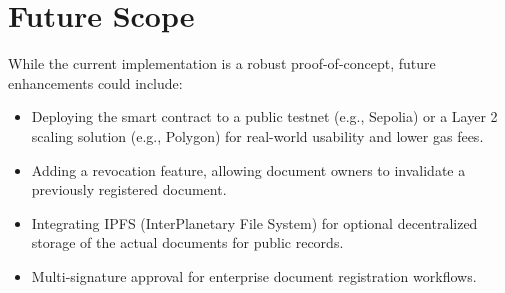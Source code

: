 \documentclass[12pt, a4paper]{article}
\begin{document}
\section{Future Scope}
While the current implementation is a robust proof-of-concept, future enhancements could include:
\begin{itemize}
    \item Deploying the smart contract to a public testnet (e.g., Sepolia) or a Layer 2 scaling solution (e.g., Polygon) for real-world usability and lower gas fees.
    \item Adding a revocation feature, allowing document owners to invalidate a previously registered document.
    \item Integrating IPFS (InterPlanetary File System) for optional decentralized storage of the actual documents for public records.
    \item Multi-signature approval for enterprise document registration workflows.
\end{itemize}
\end{document}
